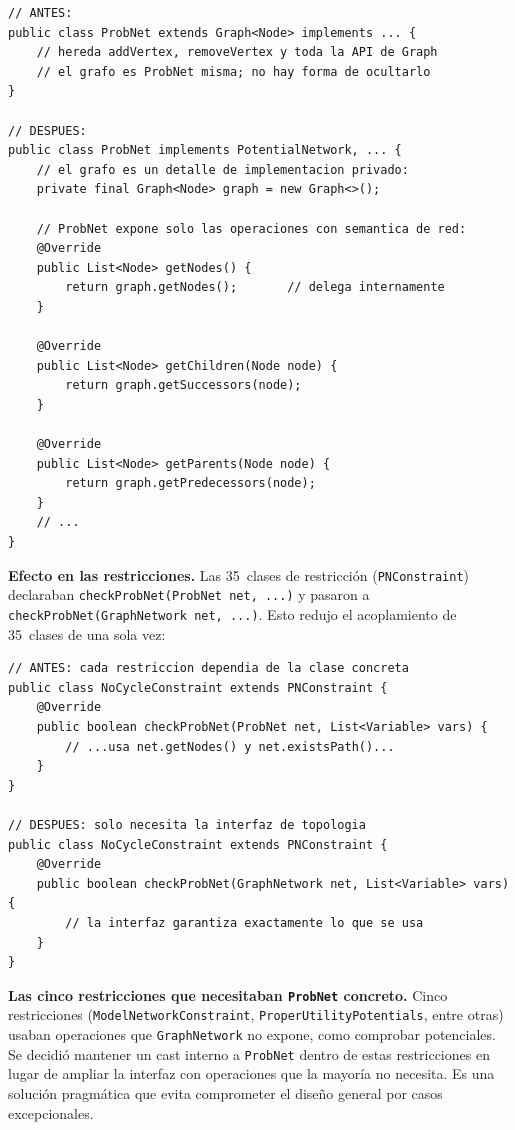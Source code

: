 \documentclass[11pt,a4paper]{article}
\newcommand{\code}[1]{\texttt{#1}}
\begin{document}
\begin{lstlisting}[caption={Cambio de herencia a composición en \texttt{ProbNet}.},
                   label=lst:herencia-composicion]
// ANTES:
public class ProbNet extends Graph<Node> implements ... {
    // hereda addVertex, removeVertex y toda la API de Graph
    // el grafo es ProbNet misma; no hay forma de ocultarlo
}

// DESPUES:
public class ProbNet implements PotentialNetwork, ... {
    // el grafo es un detalle de implementacion privado:
    private final Graph<Node> graph = new Graph<>();

    // ProbNet expone solo las operaciones con semantica de red:
    @Override
    public List<Node> getNodes() {
        return graph.getNodes();       // delega internamente
    }

    @Override
    public List<Node> getChildren(Node node) {
        return graph.getSuccessors(node);
    }

    @Override
    public List<Node> getParents(Node node) {
        return graph.getPredecessors(node);
    }
    // ...
}
\end{lstlisting}

\textbf{Efecto en las restricciones.}  Las 35~clases de restricción
(\code{PNConstraint}) declaraban \code{checkProbNet(ProbNet net, ...)}
y pasaron a \code{checkProbNet(GraphNetwork net, ...)}.  Esto redujo el
acoplamiento de 35~clases de una sola vez:

\begin{lstlisting}[caption={Restricciones desacopladas de \texttt{ProbNet}.},
                   label=lst:constraint]
// ANTES: cada restriccion dependia de la clase concreta
public class NoCycleConstraint extends PNConstraint {
    @Override
    public boolean checkProbNet(ProbNet net, List<Variable> vars) {
        // ...usa net.getNodes() y net.existsPath()...
    }
}

// DESPUES: solo necesita la interfaz de topologia
public class NoCycleConstraint extends PNConstraint {
    @Override
    public boolean checkProbNet(GraphNetwork net, List<Variable> vars) {
        // la interfaz garantiza exactamente lo que se usa
    }
}
\end{lstlisting}

\begin{nota}
\textbf{Las cinco restricciones que necesitaban \code{ProbNet} concreto.}
Cinco restricciones (\code{ModelNetworkConstraint},
\code{ProperUtilityPotentials}, entre otras) usaban operaciones que
\code{GraphNetwork} no expone, como comprobar potenciales.  Se decidió
mantener un cast interno a \code{ProbNet} dentro de estas restricciones
en lugar de ampliar la interfaz con operaciones que la mayoría no
necesita.  Es una solución pragmática que evita comprometer el diseño
general por casos excepcionales.
\end{nota}
\end{document}
